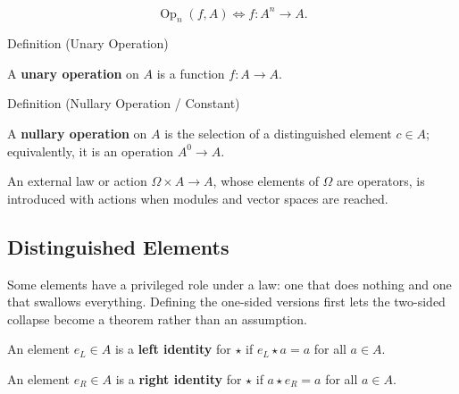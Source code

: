\begin{remark*}
\[
\operatorname{Op}_n(f,A)\Longleftrightarrow f:A^n\to A.
\]
\end{remark*}

\begin{definitionbox}{Definition (Unary Operation)}
\begin{definition}
\label{def:unary}
A \textbf{unary operation} on $A$ is a function $f:A\to A$.
\end{definition}
\end{definitionbox}

\begin{definitionbox}{Definition (Nullary Operation / Constant)}
\begin{definition}
\label{def:nullary}
A \textbf{nullary operation} on $A$ is the selection of a distinguished
element $c\in A$; equivalently, it is an operation $A^0\to A$.
\end{definition}
\end{definitionbox}

\begin{remark*}
An external law or action $\Omega\times A\to A$, whose elements of $\Omega$
are operators, is introduced with actions when modules and vector spaces are
reached.
\end{remark*}

\subsection{Distinguished Elements}
\label{sec:distinguished-elements}

\begin{remark*}
Some elements have a privileged role under a law: one that does nothing and
one that swallows everything. Defining the one-sided versions first lets the
two-sided collapse become a theorem rather than an assumption.
\end{remark*}

\begin{definition}
\label{def:left-identity}
An element $e_L\in A$ is a \textbf{left identity} for $\star$ if
$e_L\star a=a$ for all $a\in A$.
\end{definition}

\begin{definition}
\label{def:right-identity}
An element $e_R\in A$ is a \textbf{right identity} for $\star$ if
$a\star e_R=a$ for all $a\in A$.
\end{definition}

